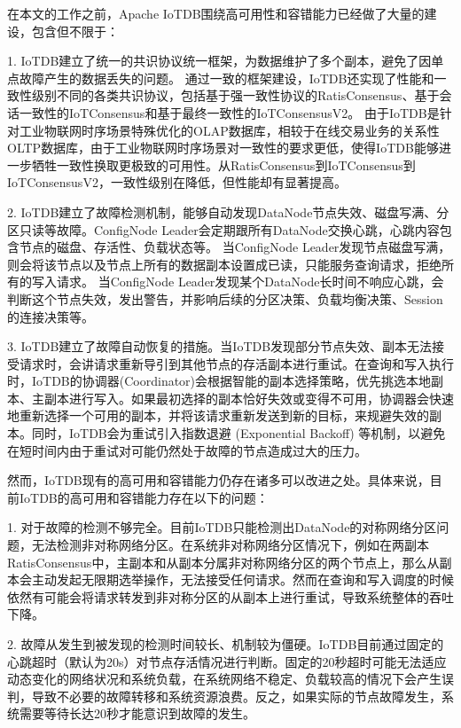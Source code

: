 在本文的工作之前，Apache IoTDB围绕高可用性和容错能力已经做了大量的建设，包含但不限于：

1. IoTDB建立了统一的共识协议统一框架，为数据维护了多个副本，避免了因单点故障产生的数据丢失的问题。
通过一致的框架建设，IoTDB还实现了性能和一致性级别不同的各类共识协议，包括基于强一致性协议的RatisConsensus、基于会话一致性的IoTConsensus和基于最终一致性的IoTConsensusV2。
由于IoTDB是针对工业物联网时序场景特殊优化的OLAP\cite{chaudhuri1997olap}数据库，相较于在线交易业务的关系性OLTP\cite{harizopoulos2018oltp}数据库，由于工业物联网时序场景对一致性的要求更低，使得IoTDB能够进一步牺牲一致性换取更极致的可用性。从RatisConsensus到IoTConsensus到IoTConsensusV2，一致性级别在降低，但性能却有显著提高。

2. IoTDB建立了故障检测机制，能够自动发现DataNode节点失效、磁盘写满、分区只读等故障。ConfigNode Leader会定期跟所有DataNode交换心跳，心跳内容包含节点的磁盘、存活性、负载状态等。
当ConfigNode Leader发现节点磁盘写满，则会将该节点以及节点上所有的数据副本设置成已读，只能服务查询请求，拒绝所有的写入请求。
当ConfigNode Leader发现某个DataNode长时间不响应心跳，会判断这个节点失效，发出警告，并影响后续的分区决策、负载均衡决策、Session的连接决策等。


3. IoTDB建立了故障自动恢复的措施。当IoTDB发现部分节点失效、副本无法接受请求时，会讲请求重新导引到其他节点的存活副本进行重试。在查询和写入执行时，IoTDB的协调器(Coordinator)会根据智能的副本选择策略，优先挑选本地副本、主副本进行写入。如果最初选择的副本恰好失效或变得不可用，协调器会快速地重新选择一个可用的副本，并将该请求重新发送到新的目标，来规避失效的副本。同时，IoTDB会为重试引入指数退避 (Exponential Backoff) 等机制，以避免在短时间内由于重试对可能仍然处于故障的节点造成过大的压力。


然而，IoTDB现有的高可用和容错能力仍存在诸多可以改进之处。具体来说，目前IoTDB的高可用和容错能力存在以下的问题：

1. 对于故障的检测不够完全。目前IoTDB只能检测出DataNode的对称网络分区问题，无法检测非对称网络分区。在系统非对称网络分区情况下，例如在两副本RatisConsensus中，主副本和从副本分属非对称网络分区的两个节点上，那么从副本会主动发起无限期选举操作，无法接受任何请求。然而在查询和写入调度的时候依然有可能会将请求转发到非对称分区的从副本上进行重试，导致系统整体的吞吐下降。

2. 故障从发生到被发现的检测时间较长、机制较为僵硬。IoTDB目前通过固定的心跳超时（默认为20s）对节点存活情况进行判断。固定的20秒超时可能无法适应动态变化的网络状况和系统负载，在系统网络不稳定、负载较高的情况下会产生误判，导致不必要的故障转移和系统资源浪费。反之，如果实际的节点故障发生，系统需要等待长达20秒才能意识到故障的发生。

